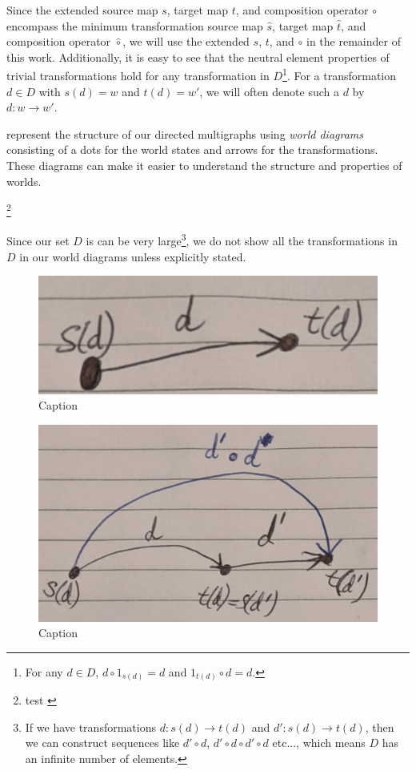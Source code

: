 Since the extended source map $s$, target map $t$, and composition operator $\circ$ encompass the minimum transformation source map $\hat{s}$, target map $\hat{t}$, and composition operator $\hat{\circ}$, we will use the extended $s$, $t$, and $\circ$ in the remainder of this work.
Additionally, it is easy to see that the neutral element properties of trivial transformations hold for any transformation in $D$\footnote{For any $d \in D$, $d \circ 1_{s(d)} = d$ and $1_{t(d)} \circ d = d$.}.
For a transformation $d \in D$ with $s(d) = w$ and $t(d) = w'$, we will often denote such a $d$ by $d: w \to w'$.




 represent the structure of our directed multigraphs using \emph{world diagrams} consisting of a dots for the world states and arrows for the transformations.
These diagrams can make it easier to understand the structure and properties of worlds.


\autocite{barr1990category}\footnote{test 
\autocite{barr1990category}
}

Since our set $D$ is can be very large\footnote{
If we have transformations $d: s(d) \to t(d)$ and $d': s(d) \to t(d)$, then we can construct sequences like $d' \circ d$, $d' \circ d \circ d' \circ d$ etc..., which means $D$ has an infinite number of elements.
}, we do not show all the transformations in $D$ in our world diagrams unless explicitly stated.


\begin{figure}
    \centering
    \includegraphics[width=0.5\linewidth]{2MathematicalFramework/InitialFramework/Images/transformation.jpg}
    \caption{Caption}
    \label{fig:transformation}
\end{figure}

\begin{figure}
    \centering
    \includegraphics[width=0.5\linewidth]{2MathematicalFramework/InitialFramework/Images/transformation_composition.jpg}
    \caption{Caption}
    \label{fig:transformation_composition}
\end{figure}

